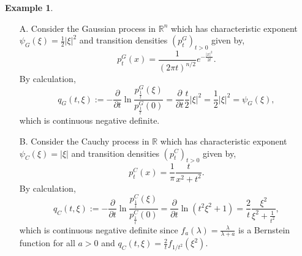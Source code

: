 \documentclass[a4paper, 12pt]{report}
\theoremstyle{remark}
\theoremstyle{definition}
\newtheorem{example}[theorem]{Example}
\begin{document}
\begin{example}\label{TDSME2}
\hspace{0.5cm}
\begin{itemize}
\item[A.] Consider the Gaussian process in $\mathbb{R}^n$ which has characteristic exponent $\psi_G(\xi) = \frac{1}{2}|\xi|^2$ and transition densities $(p_t^G)_{t > 0}$ given by,
$$
p_t^G(x) = \frac{1}{(2\pi t)^{n/2}}e^{-\frac{|x|^2}{2t}}.
$$
By calculation,
$$
q_G(t, \xi) := -\frac{\partial}{\partial t}\ln\frac{p_\frac{1}{t}^G(\xi)}{p_\frac{1}{t}^G(0)} = \frac{\partial}{\partial t}\frac{t}{2}|\xi|^2 = \frac{1}{2}|\xi|^2 = \psi_G(\xi),
$$
which is continuous negative definite.

\item[B.] Consider the Cauchy process in $\mathbb{R}$ which has characteristic exponent $\psi_C(\xi) = |\xi|$ and transition densities $(p_t^C)_{t > 0}$ given by,
$$
p_t^C(x) = \frac{1}{\pi}\frac{t}{x^2 + t^2}.
$$
By calculation,
$$
q_C(t, \xi) := -\frac{\partial}{\partial t}\ln\frac{p_\frac{1}{t}^C(\xi)}{p_\frac{1}{t}^C(0)} = \frac{\partial}{\partial t}\ln(t^2\xi^2 + 1) = \frac{2}{t}\frac{\xi^2}{\xi^2 + \frac{1}{t^2}},
$$
which is continuous negative definite since $f_a(\lambda) = \frac{\lambda}{\lambda + a}$ is a Bernstein function for all $a > 0$ and $q_C(t, \xi) = \frac{2}{t}f_{1/t^2}(\xi^2)$.


\end{itemize}
\end{example}
\end{document}
